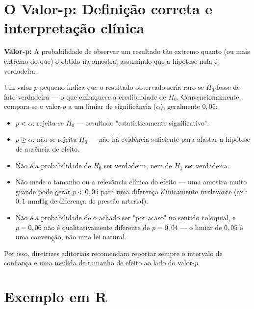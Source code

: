 \section{O Valor-p: Definição correta e interpretação clínica}

\begin{definition}
\textbf{Valor-p:} A probabilidade de observar um resultado tão extremo quanto (ou mais extremo do que) o obtido na amostra, assumindo que a hipótese nula é verdadeira.
\end{definition}

Um valor-$p$ pequeno indica que o resultado observado seria raro se $H_0$ fosse de fato verdadeira --- o que enfraquece a credibilidade de $H_0$. Convencionalmente, compara-se o valor-$p$ a um limiar de significância ($\alpha$), geralmente $0{,}05$:
\begin{itemize}
    \item $p < \alpha$: rejeita-se $H_0$ --- resultado "estatisticamente significativo".
    \item $p \ge \alpha$: não se rejeita $H_0$ --- não há evidência suficiente para afastar a hipótese de ausência de efeito.
\end{itemize}

\begin{deepdive}

\begin{itemize}
    \item Não é a probabilidade de $H_0$ ser verdadeira, nem de $H_1$ ser verdadeira.
    \item Não mede o tamanho ou a relevância clínica do efeito --- uma amostra muito grande pode gerar $p < 0{,}05$ para uma diferença clinicamente irrelevante (ex.: $0{,}1\text{ mmHg}$ de diferença de pressão arterial).
    \item Não é a probabilidade de o achado ser "por acaso" no sentido coloquial, e $p = 0{,}06$ não é qualitativamente diferente de $p = 0{,}04$ --- o limiar de $0{,}05$ é uma convenção, não uma lei natural.
\end{itemize}
Por isso, diretrizes editoriais recomendam reportar sempre o intervalo de confiança e uma medida de tamanho de efeito ao lado do valor-$p$.
\end{deepdive}

\section{Exemplo em R}

